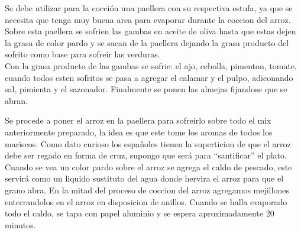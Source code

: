 Se debe utilizar para la cocción una paellera con su respectiva estufa, ya que se necesita que tenga muy buena area para evaporar durante la coccion del arroz. Sobre esta paellera se sofrien las gambas en aceite de oliva hasta que estas dejen la grasa de color pardo y se sacan de la paellera dejando la grasa producto del sofrito como base para sofreir las verduras.\\

Con la grasa producto de las gambas se sofrie: el ajo, cebolla, pimenton, tomate, cuando todos esten sofritos se pasa a agregar el calamar y el pulpo, adiconando sal, pimienta y el sazonador. Finalmente se ponen las almejas fijandose que se abran.

Se procede a poner el arroz en la paellera para sofreirlo sobre todo el mix anteriormente preparado, la idea es que este tome los aromas de todos los mariscos. Como dato curioso los españoles tienen la superticion de que el arroz debe ser regado en forma de cruz, supongo que será para “santificar” el plato.\\

Cuando se vea un color pardo sobre el arroz se agrega el caldo de pescado, este servirá como un liquido sustituto del agua donde hervira el arroz para que el grano abra. En la mitad del proceso de coccion del arroz agregamos mejillones enterrandolos en el arroz en disposicion de anillos. Cuando se halla evaporado todo el caldo, se tapa con papel aluminio y se espera aproximadamente 20 minutos.
